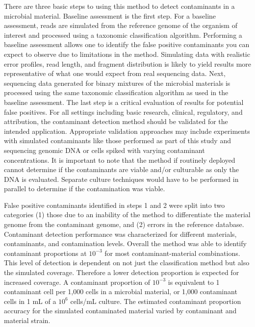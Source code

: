 \documentclass[fleqn,10pt,lineno]{wlpeerj}\usepackage[]{graphicx}\usepackage[]{color}
\begin{document}
There are three basic steps to using this method to detect contaminants in a microbial material. 
Baseline assessment is the first step. 
For a baseline assessment, reads are simulated from the reference genome of the organism of interest and processed using a taxonomic classification algorithm. 
Performing a baseline assessment allows one to identify the false positive contaminants you can expect to observe due to limitations in the method. 
Simulating data with realistic error profiles, read length, and fragment distribution is likely to yield results more representative of what one would expect from real sequencing data.
Next, sequencing data generated for binary mixtures of the microbial materials is processed using the same taxonomic classification algorithm as used in the baseline assessment.
The last step is a critical evaluation of results for potential false positives. 
For all settings including basic research, clinical, regulatory, and attribution, the contaminant detection method should be validated for the intended application.  
Appropriate validation approaches may include experiments with simulated contaminants like those performed as part of this study and sequencing genomic DNA or cells spiked with varying contaminant concentrations. It is important to note that the method if routinely deployed cannot determine if the contaminants are viable and/or culturable as only the DNA is evaluated.  Separate culture techniques would have to be performed in parallel to determine if the contamination was viable. 

False positive contaminants identified in steps 1 and 2 were split into two categories (1) those due to an inability of the method to differentiate the material genome from the contaminant genome, and (2) errors in the reference database.
Contaminant detection performance was characterized for different materials, contaminants, and contamination levels.
Overall the method was able to identify contaminant proportions at $10^{-3}$ for most contaminant-material combinations. 
This level of detection is dependent on not just the classification method but also the simulated coverage. 
Therefore a lower detection proportion is expected for increased coverage. 
A contaminant proportion of $10^{-3}$ is equivalent to 1 contaminant cell per 1,000 cells in a microbial material, or 1,000 contaminant cells in 1 mL of a $10^{6}$ cells/mL culture.
The estimated contaminant proportion accuracy for the simulated contaminated material varied by contaminant and material strain.
\end{document}
